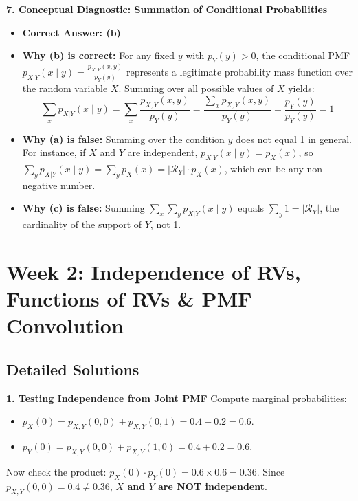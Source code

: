 \textbf{7. Conceptual Diagnostic: Summation of Conditional Probabilities}
\begin{itemize}
    \item \textbf{Correct Answer: (b)}
    \item \textbf{Why (b) is correct:} For any fixed $y$ with $p_Y(y) > 0$, the conditional PMF $p_{X|Y}(x \mid y) = \frac{p_{X,Y}(x, y)}{p_Y(y)}$ represents a legitimate probability mass function over the random variable $X$. Summing over all possible values of $X$ yields:
    $$\sum_{x} p_{X|Y}(x \mid y) = \sum_{x} \frac{p_{X,Y}(x, y)}{p_Y(y)} = \frac{\sum_x p_{X,Y}(x, y)}{p_Y(y)} = \frac{p_Y(y)}{p_Y(y)} = 1$$
    \item \textbf{Why (a) is false:} Summing over the condition $y$ does not equal 1 in general. For instance, if $X$ and $Y$ are independent, $p_{X|Y}(x \mid y) = p_X(x)$, so $\sum_y p_{X|Y}(x \mid y) = \sum_y p_X(x) = |\mathcal{R}_Y| \cdot p_X(x)$, which can be any non-negative number.
    \item \textbf{Why (c) is false:} Summing $\sum_x \sum_y p_{X|Y}(x \mid y)$ equals $\sum_y 1 = |\mathcal{R}_Y|$, the cardinality of the support of $Y$, not 1.
\end{itemize}

\section*{Week 2: Independence of RVs, Functions of RVs \& PMF Convolution}

\subsection*{Detailed Solutions}

\textbf{1. Testing Independence from Joint PMF}
Compute marginal probabilities:
\begin{itemize}
    \item $p_X(0) = p_{X,Y}(0, 0) + p_{X,Y}(0, 1) = 0.4 + 0.2 = 0.6$.
    \item $p_Y(0) = p_{X,Y}(0, 0) + p_{X,Y}(1, 0) = 0.4 + 0.2 = 0.6$.
\end{itemize}
Now check the product: $p_X(0) \cdot p_Y(0) = 0.6 \times 0.6 = 0.36$.
Since $p_{X,Y}(0, 0) = 0.4 \neq 0.36$, \textbf{$X$ and $Y$ are NOT independent}.

